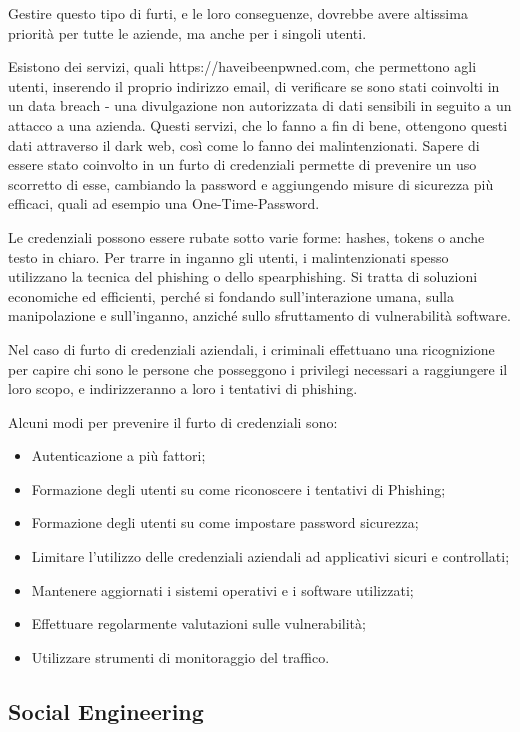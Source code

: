 Gestire questo tipo di furti, e le loro conseguenze, dovrebbe avere altissima priorità per tutte le aziende, ma anche per i singoli utenti.

Esistono dei servizi, quali https://haveibeenpwned.com, che permettono agli utenti, inserendo il proprio indirizzo email, di verificare se sono stati coinvolti in un data breach - una divulgazione non autorizzata di dati sensibili in seguito a un attacco a una azienda. Questi servizi, che lo fanno a fin di bene, ottengono questi dati attraverso il dark web, così come lo fanno dei malintenzionati. Sapere di essere stato coinvolto in un furto di credenziali permette di prevenire un uso scorretto di esse, cambiando la password e aggiungendo misure di sicurezza più efficaci, quali ad esempio una One-Time-Password.

Le credenziali possono essere rubate sotto varie forme: hashes, tokens o anche testo in chiaro. Per trarre in inganno gli utenti, i malintenzionati spesso utilizzano la tecnica del phishing o dello spearphishing. Si tratta di soluzioni economiche ed efficienti, perché si fondando sull'interazione umana, sulla manipolazione e sull'inganno, anziché sullo sfruttamento di vulnerabilità software.

Nel caso di furto di credenziali aziendali, i criminali effettuano una ricognizione per capire chi sono le persone che posseggono i privilegi necessari a raggiungere il loro scopo, e indirizzeranno a loro i tentativi di phishing.

Alcuni modi per prevenire il furto di credenziali sono:
\begin{itemize}
    \item Autenticazione a più fattori;
    \item Formazione degli utenti su come riconoscere i tentativi di Phishing;
    \item Formazione degli utenti su come impostare password sicurezza;
    \item Limitare l'utilizzo delle credenziali aziendali ad applicativi sicuri e controllati;
    \item Mantenere aggiornati i sistemi operativi e i software utilizzati;
    \item Effettuare regolarmente valutazioni sulle vulnerabilità;
    \item Utilizzare strumenti di monitoraggio del traffico.
\end{itemize}

\subsection{Social Engineering}

